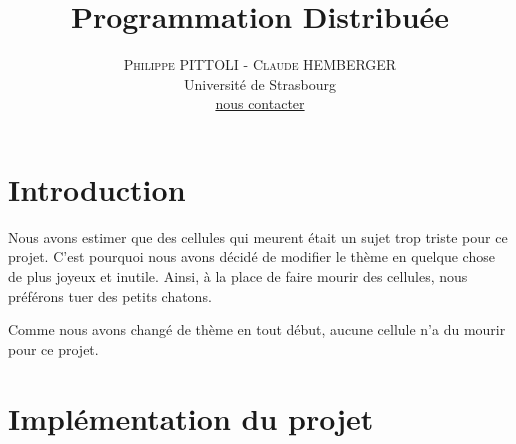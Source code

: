 \documentclass[twoside]{article}
\title{\vspace{-15mm}\fontsize{24pt}{10pt}\selectfont\textbf{Programmation Distribuée}}
\author{
\large
\textsc{Philippe PITTOLI - Claude HEMBERGER}\\[2mm]
\normalsize Université de Strasbourg \\ 
\normalsize \href{mailto:philippe.pittoli@etu.unistra.fr}{nous contacter}
\vspace{-5mm}
}
\date{}
\begin{document}
\maketitle %

\thispagestyle{fancy} %



\section{Introduction}
Nous avons estimer que des cellules qui meurent était un sujet trop triste pour ce projet.
C'est pourquoi nous avons décidé de modifier le thème en quelque chose de plus joyeux et inutile.
Ainsi, à la place de faire mourir des cellules, nous préférons tuer des petits chatons.

Comme nous avons changé de thème en tout début, aucune cellule n'a du mourir pour ce projet.

\section{Implémentation du projet}
\end{document}
